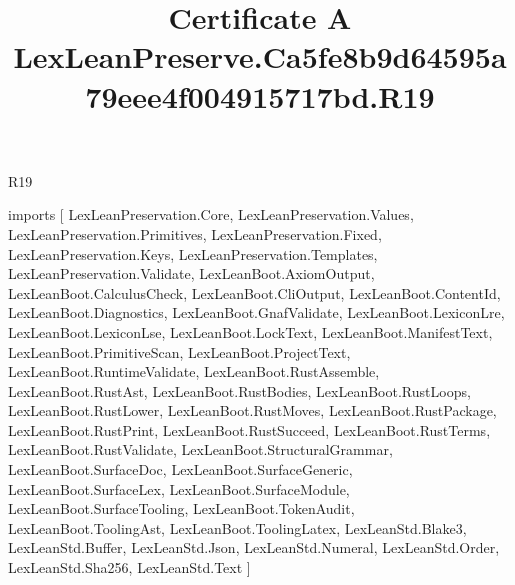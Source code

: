 \begin{lexlean}{R19}
\title{Certificate A LexLeanPreserve.Ca5fe8b9d64595a79eee4f004915717bd.R19}
\begin{coremodule}
imports [
  LexLeanPreservation.Core,
  LexLeanPreservation.Values,
  LexLeanPreservation.Primitives,
  LexLeanPreservation.Fixed,
  LexLeanPreservation.Keys,
  LexLeanPreservation.Templates,
  LexLeanPreservation.Validate,
  LexLeanBoot.AxiomOutput,
  LexLeanBoot.CalculusCheck,
  LexLeanBoot.CliOutput,
  LexLeanBoot.ContentId,
  LexLeanBoot.Diagnostics,
  LexLeanBoot.GnafValidate,
  LexLeanBoot.LexiconLre,
  LexLeanBoot.LexiconLse,
  LexLeanBoot.LockText,
  LexLeanBoot.ManifestText,
  LexLeanBoot.PrimitiveScan,
  LexLeanBoot.ProjectText,
  LexLeanBoot.RuntimeValidate,
  LexLeanBoot.RustAssemble,
  LexLeanBoot.RustAst,
  LexLeanBoot.RustBodies,
  LexLeanBoot.RustLoops,
  LexLeanBoot.RustLower,
  LexLeanBoot.RustMoves,
  LexLeanBoot.RustPackage,
  LexLeanBoot.RustPrint,
  LexLeanBoot.RustSucceed,
  LexLeanBoot.RustTerms,
  LexLeanBoot.RustValidate,
  LexLeanBoot.StructuralGrammar,
  LexLeanBoot.SurfaceDoc,
  LexLeanBoot.SurfaceGeneric,
  LexLeanBoot.SurfaceLex,
  LexLeanBoot.SurfaceModule,
  LexLeanBoot.SurfaceTooling,
  LexLeanBoot.TokenAudit,
  LexLeanBoot.ToolingAst,
  LexLeanBoot.ToolingLatex,
  LexLeanStd.Blake3,
  LexLeanStd.Buffer,
  LexLeanStd.Json,
  LexLeanStd.Numeral,
  LexLeanStd.Order,
  LexLeanStd.Sha256,
  LexLeanStd.Text
]


\end{coremodule}
\end{lexlean}
